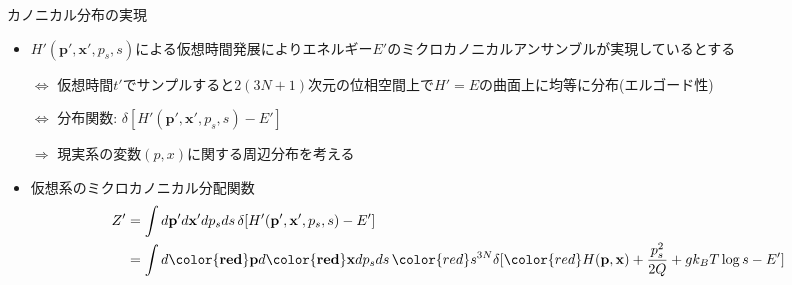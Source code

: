 
\begin{frame}[t,fragile]{カノニカル分布の実現}
  \begin{itemize}
  \item $H'(\mathbf{p}',\mathbf{x}',p_s,s)$による仮想時間発展によりエネルギー$E'$のミクロカノニカルアンサンブルが実現しているとする

    $\Leftrightarrow$ 仮想時間$t'$でサンプルすると$2(3N+1)$次元の位相空間上で$H'=E$の曲面上に均等に分布(エルゴード性)
    
    $\Leftrightarrow$ 分布関数: $\delta [ H'(\mathbf{p}',\mathbf{x}',p_s,s) - E']$
    
    $\Rightarrow$ 現実系の変数$(p,x)$に関する周辺分布を考える
  \item 仮想系のミクロカノニカル分配関数
    \begin{align*}
      Z'&=\int d\mathbf{p}' d\mathbf{x}' dp_s ds \, \delta [ H'(\mathbf{p}',\mathbf{x}',p_s,s) - E'] \\
      &=\int d\mathbf{{\color{red}p}} d\mathbf{{\color{red}x}} dp_s ds \, {\color{red}s^{3N}} \delta [ {\color{red}H(\mathbf{p},\mathbf{x})} + \frac{p_s^2}{2Q} + g k_B T \log s - E']
    \end{align*}
  \end{itemize}
\end{frame}
